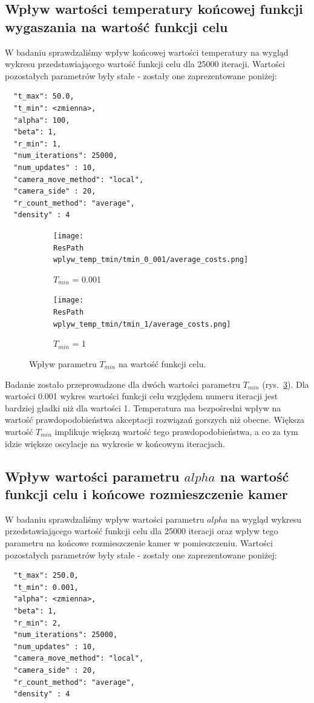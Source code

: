 \documentclass[12pt,a4paper]{article}
\newcommand{\ResPath}{../badania/}
\begin{document}
\subsection{Wpływ wartości temperatury końcowej funkcji wygaszania na wartość
funkcji celu}
W badaniu sprawdzaliśmy wpływ końcowej wartości temperatury na wygląd wykresu
przedstawiającego wartość funkcji celu dla 25000 iteracji. Wartości pozostałych
parametrów były stałe - zostały one zaprezentowane poniżej:

\begin{lstlisting}
  "t_max": 50.0,
  "t_min": <zmienna>,
  "alpha": 100,
  "beta": 1,
  "r_min": 1,
  "num_iterations": 25000,
  "num_updates" : 10,
  "camera_move_method": "local",
  "camera_side" : 20,
  "r_count_method": "average",
  "density" : 4
\end{lstlisting}
\begin{figure}[htb]
  \begin{subfigure}[b]{0.5\linewidth}
    \centering
    \texttt{[image: \\ResPath wplyw\_temp\_tmin/tmin\_0\_001/average\_costs.png]}
    \caption{$T_{min}$ = 0.001}
    \label{fig_tmin:a}
    \vspace{2ex}
  \end{subfigure}%
  \begin{subfigure}[b]{0.5\linewidth}
    \texttt{[image: \\ResPath wplyw\_temp\_tmin/tmin\_1/average\_costs.png]}
    \caption{$T_{min}$ = 1}
    \label{fig_tmin:b}
    \vspace{2ex}
  \end{subfigure}
  \caption{Wpływ parametru $T_{min}$ na wartość funkcji celu.}
  \label{fig_tmin}
\end{figure}
\newpage
Badanie zostało przeprowadzone dla dwóch wartości parametru $T_{min}$
(rys.\ \ref{fig_tmin}).
Dla wartości 0.001 wykres wartości funkcji celu względem numeru iteracji
jest bardziej gładki niż dla wartości 1. Temperatura ma bezpośredni wpływ na wartość
prawdopodobieństwa akceptacji rozwiązań gorszych niż obecne. Większa wartość $T_{min}$
implikuje większą wartość tego prawdopodobieństwa, a co za tym idzie większe oscylacje na wykresie w końcowym iteracjach.

\subsection{Wpływ wartości parametru $alpha$ na wartość funkcji celu i końcowe
rozmieszczenie kamer}
W badaniu sprawdzaliśmy wpływ wartości parametru $alpha$ na wygląd wykresu przedstawiającego
wartość funkcji celu dla 25000 iteracji oraz wpływ tego parametru na końcowe
rozmieszczenie kamer w pomieszczeniu.
Wartości pozostałych parametrów były stałe - zostały one zaprezentowane poniżej:
\begin{lstlisting}
  "t_max": 250.0,
  "t_min": 0.001,
  "alpha": <zmienna>,
  "beta": 1,
  "r_min": 2,
  "num_iterations": 25000,
  "num_updates" : 10,
  "camera_move_method": "local",
  "camera_side" : 20,
  "r_count_method": "average",
  "density" : 4
\end{lstlisting}
\end{document}
